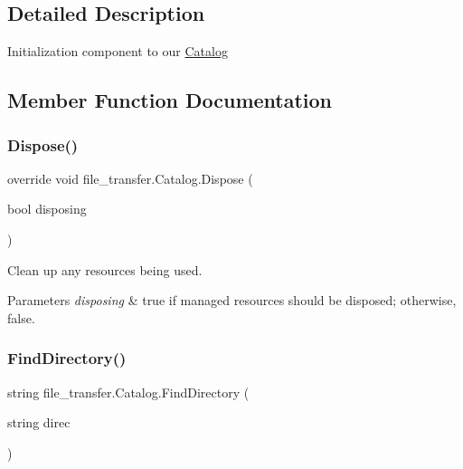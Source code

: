 \subsection{Detailed Description}
Initialization component to our \hyperlink{classfile__transfer_1_1_catalog}{Catalog} 



\subsection{Member Function Documentation}
\mbox{\label{classfile__transfer_1_1_catalog_aef867e6cdacf39f94ccf2769798196ef}} 
\subsubsection{\texorpdfstring{Dispose()}{Dispose()}}
{\footnotesize\ttfamily override void file\+\_\+transfer.\+Catalog.\+Dispose (\begin{DoxyParamCaption}\item[{bool}]{disposing }\end{DoxyParamCaption})\hspace{0.3cm}{\ttfamily [protected]}}



Clean up any resources being used. 


\begin{DoxyParams}{Parameters}
{\em disposing} & true if managed resources should be disposed; otherwise, false.\\
\hline
\end{DoxyParams}
\mbox{\label{classfile__transfer_1_1_catalog_a1e11d08f9a595a80a06c734a074461ce}} 
\subsubsection{\texorpdfstring{Find\+Directory()}{FindDirectory()}}
{\footnotesize\ttfamily string file\+\_\+transfer.\+Catalog.\+Find\+Directory (\begin{DoxyParamCaption}\item[{string}]{direc }\end{DoxyParamCaption})}



